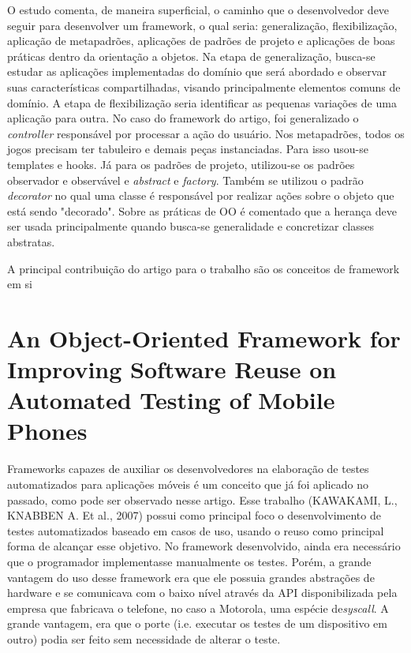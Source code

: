 \documentclass[
    12pt,       %
    openright,      %
    twoside,      %
    a4paper,      %
    english,      %
    french,       %
    spanish,      %
    brazil,       %
    ]{abntex2}
\begin{document}
      O estudo comenta, de maneira superficial, o caminho que o desenvolvedor deve seguir para desenvolver um
      framework, o qual seria: generalização, flexibilização, aplicação de metapadrões, aplicações de padrões
      de projeto e aplicações de boas práticas dentro da orientação a objetos.
      Na etapa de generalização, busca-se estudar as aplicações implementadas do domínio que será abordado
      e observar suas características compartilhadas, visando principalmente elementos comuns de domínio. A
      etapa de flexibilização seria identificar as pequenas variações de uma aplicação para outra. No caso do
      framework do artigo, foi generalizado o \textit{controller} responsável por processar a ação do usuário.
      Nos metapadrões, todos os jogos precisam ter tabuleiro e demais peças instanciadas. Para isso usou-se
      templates e hooks. Já para os padrões de projeto, utilizou-se os padrões observador e observável e
      \textit{abstract} e \textit{factory}. Também se utilizou o padrão \textit{decorator} no qual uma
      classe é responsável por realizar ações sobre o objeto que está sendo "decorado". Sobre as práticas
      de OO é comentado que a herança deve ser usada principalmente quando busca-se generalidade e concretizar classes abstratas.

      A principal contribuição do artigo para o trabalho são os conceitos de framework em si

    \section{An Object-Oriented Framework for Improving Software Reuse on Automated Testing of Mobile Phones}
      Frameworks capazes de auxiliar os desenvolvedores na elaboração de testes automatizados para aplicações
      móveis é um conceito que já foi aplicado no passado, como pode ser observado nesse artigo. Esse
      trabalho (KAWAKAMI, L., KNABBEN A. Et al., 2007) possui como principal foco o desenvolvimento de testes
      automatizados baseado em casos de uso, usando o reuso como principal forma de alcançar esse objetivo.
      No framework desenvolvido, ainda era necessário que o programador implementasse manualmente os testes.
      Porém, a grande vantagem do uso desse framework era que ele possuia grandes abstrações de hardware
      e se comunicava com o baixo nível através da API disponibilizada pela empresa que fabricava o
      telefone, no caso a Motorola, uma espécie de\textit{syscall}. A grande vantagem, era que o porte
      (i.e. executar os testes de um dispositivo em outro) podia ser feito sem necessidade de alterar o teste.
\end{document}
